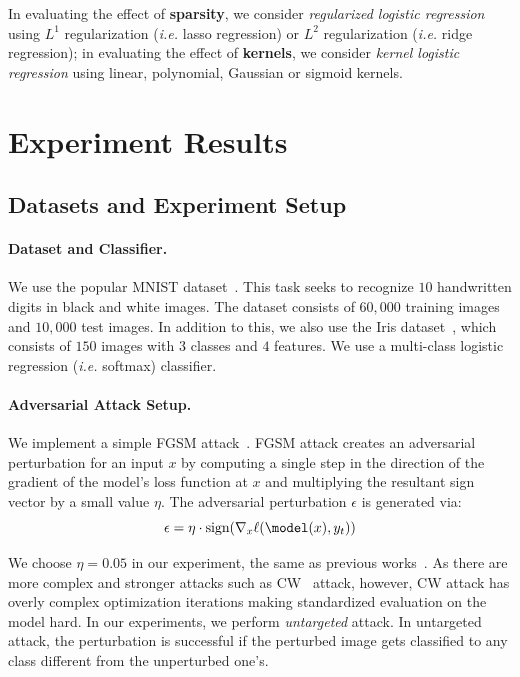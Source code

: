 \documentclass{article}
\begin{document}
In evaluating the effect of \textbf{sparsity}, we consider \textit{regularized logistic regression} using $L^{1}$ regularization (\textit{i.e.} lasso regression) or $L^{2}$ regularization (\textit{i.e.} ridge regression); in evaluating the effect of \textbf{kernels}, we consider \textit{kernel logistic regression} using linear, polynomial, Gaussian or sigmoid kernels.



\section{Experiment Results}


\subsection{Datasets and Experiment Setup}
  
\paragraph{Dataset and Classifier. } We use the popular MNIST dataset~\cite{lecun1995mnist}. This task seeks to recognize $10$ handwritten digits in black and white images. The dataset consists of $60,000$ training images and $10,000$ test images. In addition to this, we also use the Iris dataset~\cite{fisher1936uci}, which consists of $150$ images with $3$ classes and $4$ features. We use a multi-class logistic regression (\textit{i.e.} softmax) classifier.

\paragraph{Adversarial Attack Setup. } We implement a simple FGSM attack~\cite{goodfellow2014explaining}. FGSM attack creates an adversarial perturbation for an input $x$ by computing a single step in the direction of the gradient of the model's loss function at $x$ and multiplying the resultant sign vector by a small value $\eta$. The adversarial perturbation $\epsilon$ is generated via:
\begin{equation}
    \epsilon = \eta \cdot \text{sign}(\nabla_x \ell(\model(x), y_t))
\end{equation}

We choose $\eta = 0.05$ in our experiment, the same as previous works~\cite{shan2020gotta,xu2017feature}. As there are more complex and stronger attacks such as CW~\cite{cwattack} attack, however, CW attack has overly complex optimization iterations making standardized evaluation on the model hard. In our experiments, we perform \textit{untargeted} attack. In untargeted attack, the perturbation is successful if the perturbed image gets classified to any class different from the unperturbed one's. 
\end{document}
